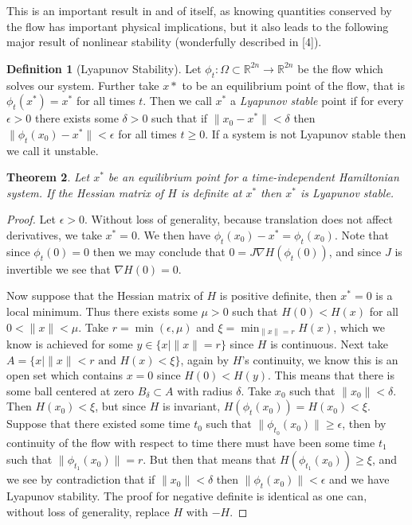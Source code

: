 \documentclass[psamsfonts,12pt]{amsart}
\newcommand\0{\mathbf{0}}
\theoremstyle{plain}
\newtheorem{thm}{Theorem}[section] %
\theoremstyle{definition}
\newtheorem{dfn}[thm]{Definition} %
\newcommand{\bbR}{\mathbb{R}}
\begin{document}
This is an important result in and of itself, as knowing quantities conserved by the flow has important physical implications, but it also leads to the following major result of nonlinear stability (wonderfully described in [4]).

\begin{dfn}[Lyapunov Stability]
Let $\phi_t\colon\Omega \subset \bbR^{2n}\rightarrow \bbR^{2n}$ be the flow which solves our system.  Further take $x*$ to be an equilibrium point of the flow, that is $\phi_t(x^*)=x^*$ for all times $t$.  Then we call $x^*$ a \textit{Lyapunov stable} point if for every $\epsilon>0$ there exists some $\delta>0$ such that if $\|x_0-x^*\|<\delta$ then $\|\phi_t(x_0)-x^*\|<\epsilon$ for all times $t\geq 0$.  If a system is not Lyapunov stable then we call it unstable.
\end{dfn}

\begin{thm}
Let $x^*$ be an equilibrium point for a time-independent Hamiltonian system.  If the Hessian matrix of $H$ is definite at $x^*$ then $x^*$ is Lyapunov stable.
\end{thm}
\begin{proof}
Let $\epsilon>0$.  Without loss of generality, because translation does not affect derivatives, we take $x^*=0$.  We then have $\phi_t(x_0)-x^*=\phi_t(x_0)$.  Note that since $\phi_t(0)=0$ then we may conclude that $0=J\nabla H(\phi_t(0))$, and since $J$ is invertible we see that $\nabla H(0)=0$.

Now suppose that the Hessian matrix of $H$ is positive definite, then $x^*=0$ is a local minimum.  Thus there exists some $\mu>0$ such that $H(0)<H(x)$ for all $0<\|x\|<\mu$.  Take $r=\min(\epsilon, \mu)$ and $\xi=\min_{\|x\|=r}H(x)$, which we know is achieved for some $y\in \{x\mid \|x\|=r\}$ since $H$ is continuous.  Next take $A=\{ x \mid \|x\|<r \text{ and } H(x)<\xi\}$, again by $H$'s continuity, we know this is an open set which contains $x=0$ since $H(0)<H(y)$.  This means that there is some ball centered at zero $B_\delta\subset A$ with radius $\delta$.  Take $x_0$ such that $\|x_0\|<\delta$.  Then $H(x_0)<\xi$, but since $H$ is invariant, $H(\phi_t(x_0))=H(x_0)<\xi$.  Suppose that there existed some time $t_0$ such that $\|\phi_{t_0}(x_0)\|\geq \epsilon$, then by continuity of the flow with respect to time there must have been some time $t_1$ such that $\|\phi_{t_1}(x_0)\|=r$.  But then that means that $H(\phi_{t_1}(x_0))\geq \xi$, and we see by contradiction that if $\|x_0\|<\delta$ then $\|\phi_t(x_0)\|<\epsilon$ and we have Lyapunov stability.  The proof for negative definite is identical as one can, without loss of generality, replace $H$ with $-H$.
\end{proof}
\end{document}
